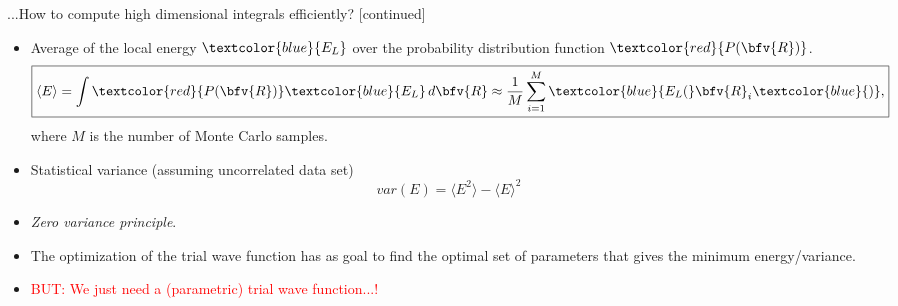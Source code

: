 \begin{frame}
	\begin{scriptsize}
		\begin{alertblock}{...How to compute high dimensional integrals efficiently? [continued]}
			\begin{itemize}
				\item Average of the local energy $\textcolor{blue}{{E}_L}$ over the probability distribution function $\textcolor{red}{P(\bfv{R})}$.
					$$
					\boxed{\langle E \rangle =  \int \textcolor{red}{P(\bfv{R})} \textcolor{blue}{{E}_L}\, d\bfv{R} \approx \frac{1}{M} \sum_{i=1}^{M} \textcolor{blue}{{E}_L(}\bfv{R}_i\textcolor{blue}{)},}
					$$
					where $M$ is the number of Monte Carlo samples.
					
				\item Statistical variance (assuming uncorrelated data set)
					$$
						\boxed{var(E) =  \langle E^2 \rangle - \langle E \rangle^2}
					$$
					

        \item \emph{Zero variance principle}.
				
				\item The optimization of the trial wave function has as goal to find the optimal set of parameters that gives the minimum energy/variance.
				
				\item \textcolor{red}{BUT: We just need a (parametric) trial wave function...!} 
			\end{itemize}
		\end{alertblock}
	\end{scriptsize}
\end{frame}


